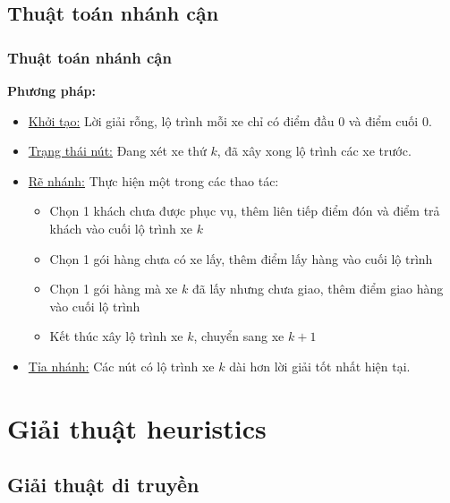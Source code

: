 \documentclass{beamer}
\begin{document}
	\subsection{Thuật toán nhánh cận}
	\begin{frame}
		\frametitle{Thuật toán nhánh cận}
		\textbf{Phương pháp:}
		\begin{itemize}
			\item \underline{Khởi tạo:} Lời giải rỗng, lộ trình mỗi xe chỉ có điểm đầu $0$ và điểm cuối $0$.
			\item \underline{Trạng thái nút:} Đang xét xe thứ $k$, đã xây xong lộ trình các xe trước.
			\item {
				\underline{Rẽ nhánh:} Thực hiện một trong các thao tác:
				\begin{itemize}
					\item Chọn 1 khách chưa được phục vụ, thêm liên tiếp điểm đón và điểm trả khách vào cuối lộ trình xe $k$
					\item Chọn 1 gói hàng chưa có xe lấy, thêm điểm lấy hàng vào cuối lộ trình
					\item Chọn 1 gói hàng mà xe $k$ đã lấy nhưng chưa giao, thêm điểm giao hàng vào cuối lộ trình
					\item Kết thúc xây lộ trình xe $k$, chuyển sang xe $k+1$
				\end{itemize}
			}
			\item \underline{Tỉa nhánh:} Các nút có lộ trình xe $k$ dài hơn lời giải tốt nhất hiện tại.
		\end{itemize}
	\end{frame}
	
	
	\section{Giải thuật heuristics}
	
	
	\subsection{Giải thuật di truyền}
	
\end{document}
